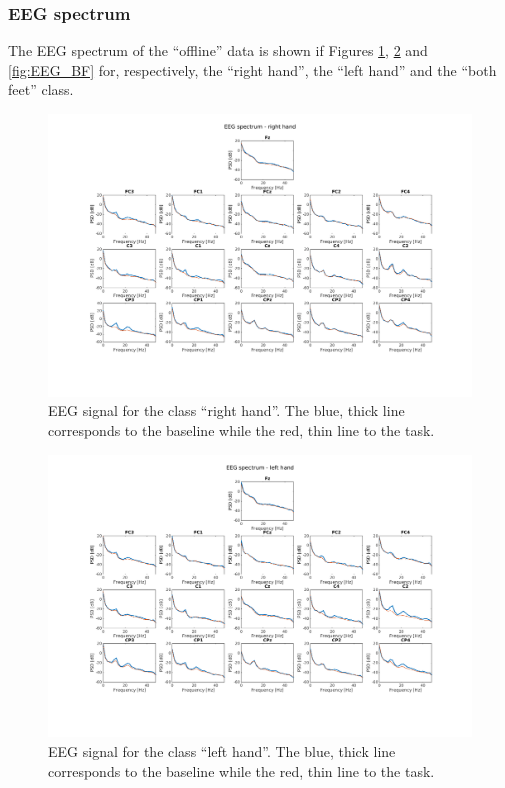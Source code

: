 \subsubsection{EEG spectrum}
The EEG spectrum of the ``offline'' data is shown if Figures \ref{fig:EEG_RH}, \ref{fig:EEG_LH} and \ref{fig:EEG_BF} for, respectively, the ``right hand'', the ``left hand'' and the ``both feet'' class.
\begin{figure}
   \centering
   \includegraphics[width=\textwidth]{images/EEG_RH.png}
   \caption{EEG signal for the class ``right hand''. The blue, thick line corresponds to the baseline while the red, thin line to the task.}
   \label{fig:EEG_RH}
\end{figure}
\begin{figure}
   \centering
   \includegraphics[width=\textwidth]{images/EEG_LH.png}
   \caption{EEG signal for the class ``left hand''. The blue, thick line corresponds to the baseline while the red, thin line to the task.}
   \label{fig:EEG_LH}
\end{figure}
